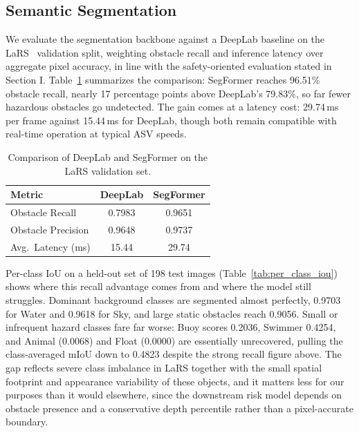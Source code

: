 \subsection{Semantic Segmentation}
We evaluate the segmentation backbone against a DeepLab baseline on the LaRS~\cite{zust2023larsdiversepanopticmaritime} validation split, weighting obstacle recall and inference latency over aggregate pixel accuracy, in line with the safety-oriented evaluation stated in Section I. Table~\ref{tab:seg_compare} summarizes the comparison: SegFormer reaches 96.51\% obstacle recall, nearly 17 percentage points above DeepLab's 79.83\%, so far fewer hazardous obstacles go undetected. The gain comes at a latency cost: 29.74\,ms per frame against 15.44\,ms for DeepLab, though both remain compatible with real-time operation at typical ASV speeds.

\begin{table}[t]
\centering
\caption{Comparison of DeepLab and SegFormer on the LaRS validation set.}
\label{tab:seg_compare}
\begin{tabular}{lcc}
\hline
Metric & DeepLab & SegFormer \\
\hline
Obstacle Recall & 0.7983 & 0.9651 \\
Obstacle Precision & 0.9648 & 0.9737 \\
Avg.\ Latency (ms) & 15.44 & 29.74 \\
\hline
\end{tabular}
\end{table}

Per-class IoU on a held-out set of 198 test images (Table~\ref{tab:per_class_iou}) shows where this recall advantage comes from and where the model still struggles. Dominant background classes are segmented almost perfectly, 0.9703 for Water and 0.9618 for Sky, and large static obstacles reach 0.9056. Small or infrequent hazard classes fare far worse: Buoy scores 0.2036, Swimmer 0.4254, and Animal (0.0068) and Float (0.0000) are essentially unrecovered, pulling the class-averaged mIoU down to 0.4823 despite the strong recall figure above. The gap reflects severe class imbalance in LaRS together with the small spatial footprint and appearance variability of these objects, and it matters less for our purposes than it would elsewhere, since the downstream risk model depends on obstacle presence and a conservative depth percentile rather than a pixel-accurate boundary.

